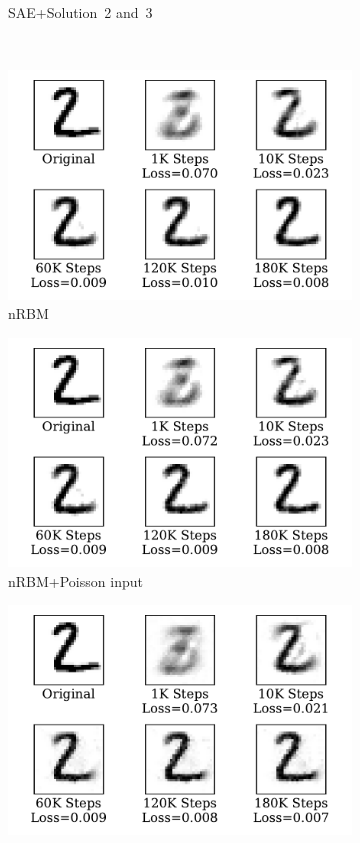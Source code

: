 \begin{figure}
\begin{subfigure}[t]{0.32\textwidth}
		\caption{SAE+Solution~2 and~3}
	\end{subfigure}\\
	\begin{subfigure}[t]{0.32\textwidth}
		\includegraphics[width=\textwidth]{pics_sdlm/32_MNIST_RBM/recon_digit.pdf}
		\caption{nRBM}
	\end{subfigure}
	\begin{subfigure}[t]{0.32\textwidth}
		\includegraphics[width=\textwidth]{pics_sdlm/33_MNIST_RBM_noise/recon_digit.pdf}
		\caption{nRBM+Poisson input}
	\end{subfigure}
	\begin{subfigure}[t]{0.32\textwidth}
		\includegraphics[width=\textwidth]{pics_sdlm/50_MNIST_SRBM_original/recon_digit.pdf}

\end{subfigure}
\end{figure}
